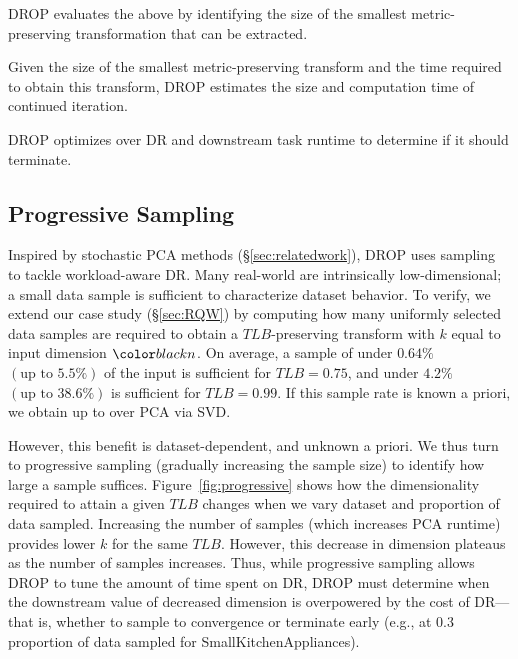 \noindent DROP evaluates the above by identifying the size of the smallest metric-preserving transformation that can be extracted. 


\noindent Given the size of the smallest metric-preserving transform and the time required to obtain this transform, DROP estimates the size and computation time of continued iteration.


\noindent DROP optimizes over DR and downstream task runtime to determine if it should terminate.

\subsection{Progressive Sampling}
\label{subsec:psample}

Inspired by stochastic PCA methods (\S\ref{sec:relatedwork}), DROP uses sampling to tackle workload-aware DR. 
Many real-world  are intrinsically low-dimensional; a small data sample is sufficient to characterize dataset behavior. 
To verify, we extend our case study (\S\ref{sec:RQW}) by computing how many uniformly selected data samples are required to obtain a $TLB$-preserving transform with $k$ equal to input dimension $\dvar$.
On average, a sample of under $0.64\%$ $(\text{up to } 5.5\%)$ of the input is sufficient for $TLB = 0.75$, and under $4.2\%$ $(\text{up to } 38.6\%)$ is sufficient for $TLB=0.99$.  
If this sample rate is known a priori, we obtain up to  over PCA via SVD.%

However, this benefit is dataset-dependent, and unknown a priori.
We thus turn to progressive sampling (gradually increasing the sample size) to identify how large a sample suffices.
Figure~\ref{fig:progressive} shows how the dimensionality required to attain a given $TLB$ changes when we vary dataset and proportion of data sampled.
Increasing the number of samples (which increases PCA runtime) provides lower $k$ for the same $TLB$.
However, this decrease in dimension plateaus as the number of samples increases.
Thus, while progressive sampling allows DROP to tune the amount of time spent on DR, DROP must determine when the downstream value of decreased dimension is overpowered by the cost of DR---that is, whether to sample to convergence or terminate early (e.g., at $0.3$ proportion of data sampled for SmallKitchenAppliances). 


